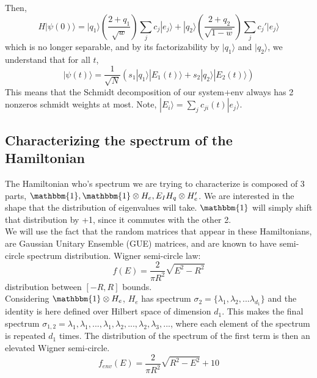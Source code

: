 \documentclass{article}
\begin{document}
Then,
\begin{equation}
    H|\psi(0)\rangle=|q_1\rangle(\frac{2+q_1}{\sqrt{w}})\sum_jc_j|e_j\rangle+|q_2\rangle(\frac{2+q_2}{\sqrt{1-w}})\sum_jc_j'|e_j\rangle
\end{equation}
which is no longer separable, and by its factorizability by $|q_1\rangle$ and $|q_2\rangle$, we understand that for all $t$,
\begin{equation}
    |\psi(t)\rangle=\frac{1}{\sqrt{N}}(s_1|q_1\rangle|E_1(t)\rangle+s_2|q_2\rangle|E_2(t)\rangle)
\end{equation}
This means that the Schmidt decomposition of our system+env always has 2 nonzeros schmidt weights at most. Note, $|E_i\rangle=\sum_jc_{ji}(t)|e_j\rangle$.

\subsection{Characterizing the spectrum of the Hamiltonian}
The Hamiltonian who's spectrum we are trying to characterize is composed of 3 parts, $\mathbbm{1}, \mathbbm{1}\otimes H_e,E_IH_q\otimes H_e'$. We are interested in the shape that the distribution of eigenvalues will take. $\mathbbm{1}$ will simply shift that distribution by +1, since it commutes with the other 2. \\

We will use the fact that the random matrices that appear in these Hamiltonians, are Gaussian Unitary Ensemble (GUE) matrices, and are known to have semi-circle spectrum distribution.
Wigner semi-circle law:
\begin{equation}
    f(E)=\frac{2}{\pi R^2}\sqrt{E^2-R^2}
\end{equation}
distribution between $[-R,R]$ bounds.\\

Considering $\mathbbm{1}\otimes H_{e}$, $H_{e}$ has spectrum $\sigma_2=\{\lambda_1,\lambda_2,...\lambda_{d_1}\}$ and the identity is here defined over Hilbert space of dimension $d_1$. This makes  the final spectrum $\sigma_{1,2}={\lambda_1, \lambda_1, ..., \lambda_1, \lambda_2, ...,\lambda_2, \lambda_3, ...}$, where each element of the spectrum is repeated $d_1$ times. The distribution of the spectrum of the first term is then an elevated Wigner semi-circle.
\begin{equation}
    f_{env}(E) = \frac{2}{\pi R^2}\sqrt{R^2-E^2} + 10
\end{equation}
\end{document}
